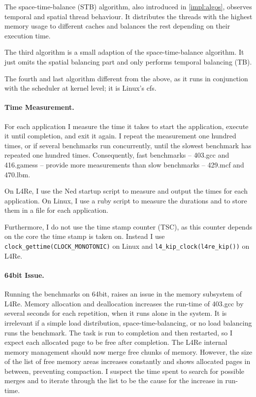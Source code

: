 The space-time-balance (STB) algorithm, also introduced in \ref{impl:algos},
observes temporal and spatial thread behaviour.
It distributes the threads with the highest memory usage to different caches
and balances the rest depending on their execution time.

The third algorithm is a small adaption of the space-time-balance algorithm.
It just omits the spatial balancing part and only performs temporal balancing
(TB).

The fourth and last algorithm different from the above, as it runs in
conjunction with the scheduler at kernel level; it is Linux's \gls{cfs}.


\paragraph{Time Measurement.}
For each application I measure the time it takes to start the application,
execute it until completion, and exit it again.
I repeat the measurement one hundred times, or if several benchmarks run
concurrently, until the slowest benchmark has repeated one hundred times.
Consequently, fast benchmarks -- 403.gcc and  416.gamess -- provide more
measurements than slow benchmarks -- 429.mcf and 470.lbm.

On L4Re, I use the Ned startup script to measure and output the times for
each application.
On Linux, I use a ruby script to measure the durations and to store them in a
file for each application.

Furthermore, I do not use the time stamp counter (TSC), as this counter depends
on the core the time stamp is taken on.
Instead I use \texttt{clock\_gettime(CLOCK\_MONOTONIC)} on Linux and
\texttt{l4\_kip\_clock(l4re\_kip())} on L4Re.


\paragraph{64bit Issue.}
Running the benchmarks on 64bit, raises an issue in the memory subsystem of L4Re.
Memory allocation and deallocation increases the run-time of 403.gcc by several
seconds for each repetition, when it runs alone in the system.
It is irrelevant if a simple load distribution, space-time-balancing,
or no load balancing runs the benchmark.
The task is run to completion and then restarted, so I expect each allocated
page to be free after completion.
The L4Re internal memory management should now merge free chunks of memory.
However, the size of the list of free memory areas increases constantly and
shows allocated pages in between, preventing compaction.
I suspect the time spent to search for possible merges and to iterate through
the list to be the cause for the increase in run-time.

